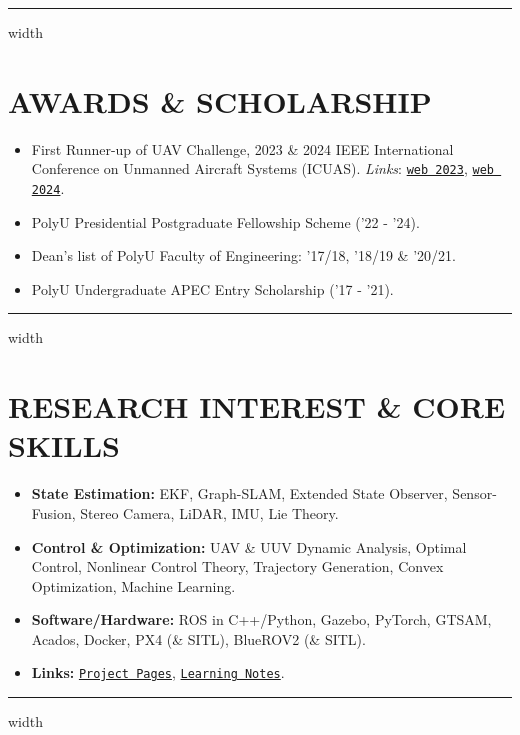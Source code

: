 \documentclass[overlapped]{res}
\newcommand{\pink}[1]{\textcolor{pink!40!red}{#1}} %
\begin{document}
\begin{resume}
\begin{itemize}
\end{itemize}

\par\noindent\hrule width \linewidth %
\section{AWARDS \& SCHOLARSHIP}
\begin{itemize}
  \item First Runner-up of UAV Challenge, 2023 \& 2024 IEEE International Conference on Unmanned Aircraft Systems (ICUAS). \textit{Links}: \pink{
    \texttt{\href{https://www.polyu.edu.hk/publications/pulse-polyu/issue/202308/achievements/aae-team-wins-first-runner-up-prize-at-icuas-23-uav-competition}{web 2023}}}, 
    \pink{
    \texttt{\href{https://www.polyu.edu.hk/aae/news-and-events/news/2024/jun-20_icuas-2024-first-runner-up/}{web 2024}}}. 
  \item PolyU Presidential Postgraduate Fellowship Scheme ('22 - '24).
  \item Dean’s list of PolyU Faculty of Engineering: '17/18, '18/19 \& '20/21.
  \item PolyU Undergraduate APEC Entry Scholarship ('17 - '21).
\end{itemize}
\par\noindent\hrule width \linewidth %
\section{RESEARCH INTEREST \& CORE SKILLS}
\begin{itemize}
  \item \textbf{State Estimation:} EKF, Graph-SLAM, Extended State Observer, Sensor-Fusion, Stereo Camera, LiDAR, IMU, Lie Theory.
  \item \textbf{Control \& Optimization:} UAV \& UUV Dynamic Analysis, Optimal Control, Nonlinear Control Theory, Trajectory Generation, Convex Optimization, Machine Learning. 
  \item \textbf{Software/Hardware:} ROS in C++/Python, Gazebo, PyTorch, GTSAM, Acados, Docker, PX4 (\& SITL), BlueROV2 (\& SITL).
  \item \textbf{Links:} \pink{{\texttt{\href{https://pattylo.github.io/projects/}{Project Pages}}}}, \pink{{\texttt{\href{https://pattylo.github.io/learning/}{Learning Notes}}}}.
\end{itemize}
\par\noindent\hrule width \linewidth %

\end{resume}
\end{document}
